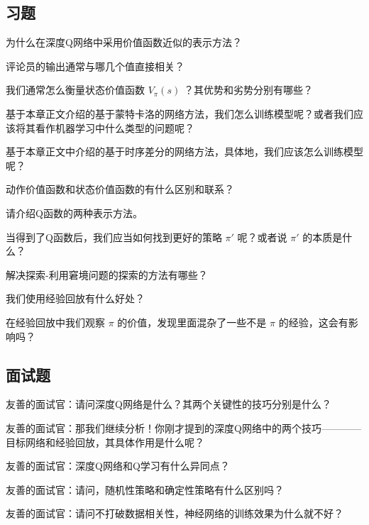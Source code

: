 \subsection{习题}

 为什么在深度Q网络中采用价值函数近似的表示方法？

 评论员的输出通常与哪几个值直接相关？

 我们通常怎么衡量状态价值函数 $V_{\pi}(s)$ ？其优势和劣势分别有哪些？

 基于本章正文介绍的基于蒙特卡洛的网络方法，我们怎么训练模型呢？或者我们应该将其看作机器学习中什么类型的问题呢？

 基于本章正文中介绍的基于时序差分的网络方法，具体地，我们应该怎么训练模型呢？

 动作价值函数和状态价值函数的有什么区别和联系？

 请介绍Q函数的两种表示方法。

 当得到了Q函数后，我们应当如何找到更好的策略 $\pi'$ 呢？或者说 $\pi'$ 的本质是什么？

 解决探索-利用窘境问题的探索的方法有哪些？

 我们使用经验回放有什么好处？

 在经验回放中我们观察 $\pi$ 的价值，发现里面混杂了一些不是 $\pi$ 的经验，这会有影响吗？

  
\subsection{面试题}

 友善的面试官：请问深度Q网络是什么？其两个关键性的技巧分别是什么？

 友善的面试官：那我们继续分析！你刚才提到的深度Q网络中的两个技巧————目标网络和经验回放，其具体作用是什么呢？

 友善的面试官：深度Q网络和Q学习有什么异同点？

 友善的面试官：请问，随机性策略和确定性策略有什么区别吗？

 友善的面试官：请问不打破数据相关性，神经网络的训练效果为什么就不好？
